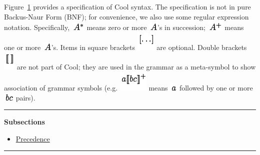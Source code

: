 \documentclass[]{article}
\begin{document}
Figure~\hyperref[fig1]{1} provides a specification of Cool syntax. The
specification is not in pure Backus-Naur Form (BNF); for convenience, we
also use some regular expression notation. Specifically,
\includegraphics{img44.png} means zero or more
\includegraphics{img45.png}'s in succession; \includegraphics{img46.png}
means one or more \includegraphics{img45.png}'s. Items in square
brackets \includegraphics{img47.png} are optional. Double brackets
\includegraphics{img48.png} are not part of Cool; they are used in the
grammar as a meta-symbol to show association of grammar symbols (e.g.
\includegraphics{img49.png} means \includegraphics{img30.png} followed
by one or more \includegraphics{img50.png} pairs).

\begin{center}\rule{3in}{0.4pt}\end{center}

\textbf{Subsections}

\begin{itemize}
\itemsep1pt\parskip0pt
\item
  \href{node40.html}{Precedence}
\end{itemize}

\begin{center}\rule{3in}{0.4pt}\end{center}
\end{document}
